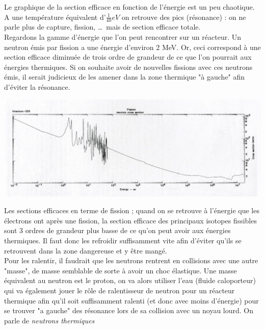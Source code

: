 Le graphique de la section efficace en fonction de l'énergie est un peu chaotique. A une température 
équivalent d'$\frac{1}{40}eV$ on retrouve des pics (résonance) : on ne parle plus de capture, 
fission, \dots \ mais de section efficace totale.\\

Regardons la gamme d'énergie que l'on peut rencontrer sur un réacteur. Un neutron émis par 
fission a une énergie d'environ 2 MeV. Or, ceci correspond à une section efficace diminuée de 
trois ordre de grandeur de ce que l'on pourrait aux énergies thermiques. Si on souhaite avoir 
de nouvelles fissions avec ces neutrons émis, il serait judicieux de les amener dans la zone 
thermique "à gauche" afin d'éviter la résonance.

\begin{center}
	\includegraphics[scale=0.2]{ch1/image4.png}
\end{center}

Les sections efficaces en terme de fission ; quand on se retrouve à l'énergie que les électrons ont après une fission, la section efficace des principaux isotopes fissibles sont 3 ordres de grandeur plus basse de ce qu'on peut avoir aux énergies thermiques. Il faut donc les refroidir suffisamment 
vite afin d'éviter qu'ils se retrouvent dans la zone dangereuse et y être mangé.\\


Pour les ralentir, il faudrait que les neutrons rentrent en collisions avec une autre "masse", de masse semblable de sorte à avoir un choc élastique. Une masse équivalent au neutron est le proton, 
on va alors utiliser l'eau (fluide caloporteur) qui va également jouer le rôle de ralentisseur de 
neutron pour un réacteur thermique afin qu'il soit suffisamment ralenti (et donc avec moins 
d'énergie) pour se trouver "a gauche" des résonance lors de sa collision avec un noyau lourd. On 
parle de \textit{neutrons thermiques}

\newpage

